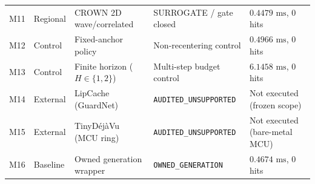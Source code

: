 \documentclass[11pt,oneside,a4paper]{report}
\newcommand{\code}[1]{{\small\upshape\ttfamily #1}}
\newcommand{\pathcode}[1]{{\small\upshape\ttfamily\nolinkurl{#1}}}
\theoremstyle{remark}
\begin{document}
\begin{table}[htbp]
\begin{tabularx}{\textwidth}{@{}P{1.0cm}P{2.5cm}P{3.8cm}YY@{}}
\code{M11} & Regional & CROWN 2D wave/correlated & \code{SURROGATE} / gate closed & $0.4479\text{ ms}$, $0$ hits \\
\code{M12} & Control & Fixed-anchor policy & Non-recentering control & $0.4966\text{ ms}$, $0$ hits \\
\code{M13} & Control & Finite horizon ($H\in\{1,2\}$) & Multi-step budget control & $6.1458\text{ ms}$, $0$ hits \\
\code{M14} & External & LipCache (\code{GuardNet}) & \pathcode{AUDITED_UNSUPPORTED} & Not executed (frozen scope) \\
\code{M15} & External & TinyD\'ej\`aVu (MCU ring) & \pathcode{AUDITED_UNSUPPORTED} & Not executed (bare-metal MCU) \\
\code{M16} & Baseline & Owned generation wrapper & \pathcode{OWNED_GENERATION} & $0.4674\text{ ms}$, $0$ hits \\
\bottomrule
\end{tabularx}
\end{table}
\end{document}
